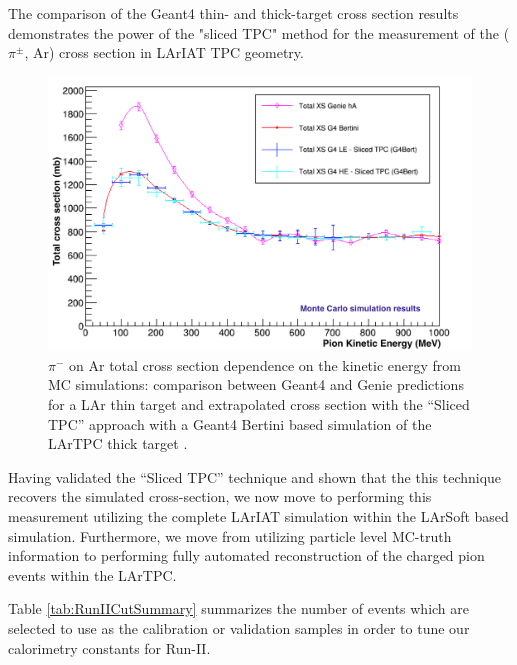 The comparison of the Geant4 thin- and thick-target cross section results demonstrates the power of the "sliced TPC" method for the measurement of the ($\pi^{\pm}$, Ar) cross section in LArIAT TPC geometry. 

\begin{figure}[h!]
\centering
\includegraphics[scale=0.45]{./images/compare_new.png}
\caption{$\pi^-$ on Ar total cross section dependence on the kinetic energy from MC simulations: comparison between Geant4 and Genie predictions for a LAr thin target and extrapolated cross section with the ``Sliced TPC'' approach with a Geant4 Bertini based simulation of the LArTPC thick target \cite{myThesis}.}
\label{fig:xsplot}
\end{figure}

Having validated the ``Sliced TPC'' technique and shown that the this technique recovers the simulated cross-section, we now move to performing this measurement utilizing the complete LArIAT simulation within the LArSoft \cite{} based simulation.  Furthermore, we move from utilizing particle level MC-truth information to performing fully automated reconstruction of the charged pion events within the LArTPC. 

 






Table \ref{tab:RunIICutSummary} summarizes the number of events which are selected to use as the calibration or validation samples in order to tune our calorimetry constants for Run-II.

